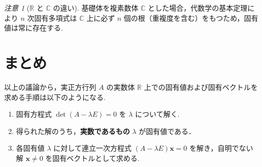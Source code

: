 \documentclass[11pt,a4paper]{article}
\theoremstyle{definition}
\theoremstyle{plain}
\theoremstyle{remark}
\newtheorem*{remark}{注意}
\newcommand{\R}{\mathbb{R}}
\newcommand{\C}{\mathbb{C}}
\begin{document}
\begin{remark}[$\R$ と $\C$ の違い]
基礎体を複素数体 $\C$ とした場合，代数学の基本定理により $n$ 次固有多項式は $\C$ 上に必ず $n$ 個の根（重複度を含む）をもつため，固有値は常に存在する.
\end{remark}

\section{まとめ}

以上の議論から，実正方行列 $A$ の実数体 $\R$ 上での固有値および固有ベクトルを求める手順は以下のようになる.
\begin{enumerate}
  \item 固有方程式 $\det(A - \lambda E) = 0$ を $\lambda$ について解く.
  \item 得られた解のうち，\textbf{実数であるもの} $\lambda$ が固有値である．
  \item 各固有値 $\lambda$ に対して連立一次方程式 $(A - \lambda E)\mathbf{x} = 0$ を解き，自明でない解 $\mathbf{x} \neq 0$ を固有ベクトルとして求める.
\end{enumerate}
\end{document}
